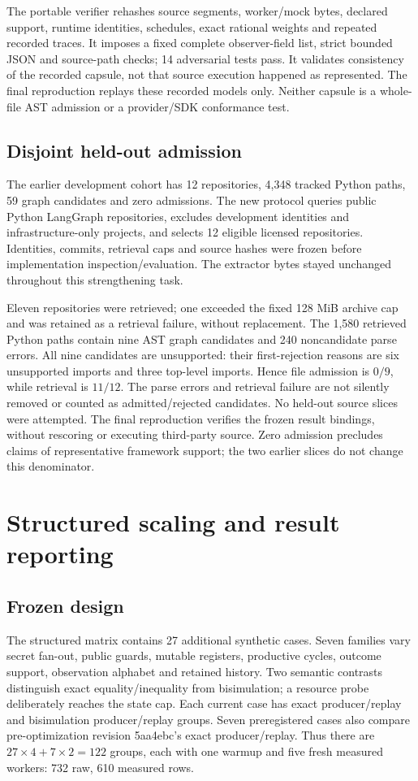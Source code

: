 \documentclass[11pt,a4paper]{article}
\begin{document}
The portable verifier rehashes source segments, worker/mock bytes, declared support, runtime identities, schedules, exact rational weights and repeated recorded traces. It imposes a fixed complete observer-field list, strict bounded JSON and source-path checks; 14 adversarial tests pass. It validates consistency of the recorded capsule, not that source execution happened as represented. The final reproduction replays these recorded models only. Neither capsule is a whole-file AST admission or a provider/SDK conformance test.

\subsection{Disjoint held-out admission}
The earlier development cohort has 12 repositories, 4,348 tracked Python paths, 59 graph candidates and zero admissions. The new protocol queries public Python LangGraph repositories, excludes development identities and infrastructure-only projects, and selects 12 eligible licensed repositories. Identities, commits, retrieval caps and source hashes were frozen before implementation inspection/evaluation. The extractor bytes stayed unchanged throughout this strengthening task.

Eleven repositories were retrieved; one exceeded the fixed 128 MiB archive cap and was retained as a retrieval failure, without replacement. The 1,580 retrieved Python paths contain nine AST graph candidates and 240 noncandidate parse errors. All nine candidates are unsupported: their first-rejection reasons are six unsupported imports and three top-level imports. Hence file admission is $0/9$, while retrieval is $11/12$. The parse errors and retrieval failure are not silently removed or counted as admitted/rejected candidates. No held-out source slices were attempted. The final reproduction verifies the frozen result bindings, without rescoring or executing third-party source. Zero admission precludes claims of representative framework support; the two earlier slices do not change this denominator.

\section{Structured scaling and result reporting}
\subsection{Frozen design}
The structured matrix contains 27 additional synthetic cases. Seven families vary secret fan-out, public guards, mutable registers, productive cycles, outcome support, observation alphabet and retained history. Two semantic contrasts distinguish exact equality/inequality from bisimulation; a resource probe deliberately reaches the state cap. Each current case has exact producer/replay and bisimulation producer/replay groups. Seven preregistered cases also compare pre-optimization revision 5aa4ebc's exact producer/replay. Thus there are $27\times4+7\times2=122$ groups, each with one warmup and five fresh measured workers: 732 raw, 610 measured rows.
\end{document}
